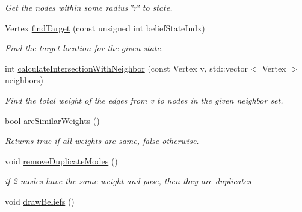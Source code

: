 \begin{DoxyCompactItemize}
\begin{DoxyCompactList}\small\item\em Get the nodes within some radius \char`\"{}r\char`\"{} to state. \end{DoxyCompactList}\item 
\hypertarget{class_n_b_m3_p_a0e5fbec093337b20754472b343c828fc}{Vertex \hyperlink{class_n_b_m3_p_a0e5fbec093337b20754472b343c828fc}{find\-Target} (const unsigned int belief\-State\-Indx)}\label{class_n_b_m3_p_a0e5fbec093337b20754472b343c828fc}

\begin{DoxyCompactList}\small\item\em Find the target location for the given state. \end{DoxyCompactList}\item 
\hypertarget{class_n_b_m3_p_a5a7b829b03f525ffb2618095b628be80}{int \hyperlink{class_n_b_m3_p_a5a7b829b03f525ffb2618095b628be80}{calculate\-Intersection\-With\-Neighbor} (const Vertex v, std\-::vector$<$ Vertex $>$ neighbors)}\label{class_n_b_m3_p_a5a7b829b03f525ffb2618095b628be80}

\begin{DoxyCompactList}\small\item\em Find the total weight of the edges from v to nodes in the given neighbor set. \end{DoxyCompactList}\item 
\hypertarget{class_n_b_m3_p_ad047dadf01b4c4aea5d75ef34f384301}{bool \hyperlink{class_n_b_m3_p_ad047dadf01b4c4aea5d75ef34f384301}{are\-Similar\-Weights} ()}\label{class_n_b_m3_p_ad047dadf01b4c4aea5d75ef34f384301}

\begin{DoxyCompactList}\small\item\em Returns true if all weights are same, false otherwise. \end{DoxyCompactList}\item 
\hypertarget{class_n_b_m3_p_af0139a2cef346c19869dbb900a9f648a}{void \hyperlink{class_n_b_m3_p_af0139a2cef346c19869dbb900a9f648a}{remove\-Duplicate\-Modes} ()}\label{class_n_b_m3_p_af0139a2cef346c19869dbb900a9f648a}

\begin{DoxyCompactList}\small\item\em if 2 modes have the same weight and pose, then they are duplicates \end{DoxyCompactList}\item 
\hypertarget{class_n_b_m3_p_a1f8ee9978daa9fd57c1fe66be3a87140}{void \hyperlink{class_n_b_m3_p_a1f8ee9978daa9fd57c1fe66be3a87140}{draw\-Beliefs} ()}\label{class_n_b_m3_p_a1f8ee9978daa9fd57c1fe66be3a87140}


\end{DoxyCompactItemize}
